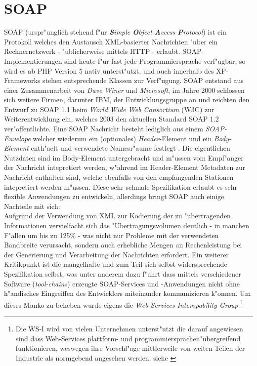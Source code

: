 \section{SOAP}
\label{sec:background:soap}
SOAP (urspr"unglich stehend f"ur \emph{\textbf{S}imple \textbf{O}bject \textbf{A}ccess \textbf{P}rotocol})
ist ein Protokoll welches den Austausch XML-basierter Nachrichten "uber ein Rechnernetzwerk - "ublicherweise
mittels HTTP - erlaubt. SOAP-Implementierungen sind heute f"ur fast jede Programmiersprache verf"ugbar, so wird es
ab PHP Version 5 nativ unterst"utzt, und auch innerhalb des XP-Frameworks stehen entsprechende Klassen zur Verf"ugung.
SOAP entstand aus einer Zusammenarbeit von \emph{Dave Winer} und \emph{Microsoft}, im Jahre 2000 schlossen sich 
weitere Firmen, darunter IBM, der Entwicklungsgruppe an und reichten den Entwurf zu SOAP 1.1 beim 
\emph{World Wide Web Consortium} (W3C) zur Weiterentwicklung ein, welches 2003 den aktuellen Standard SOAP 1.2
ver"offentlichte.
Eine SOAP Nachricht besteht lediglich aus einem \emph{SOAP-Envelope} welcher wiederum ein (optionales) \emph{Header}-Element
und ein \emph{Body-Element} enth"aelt und verwendete Namesr"aume festlegt \cite{SOAPSPEC}. Die eigentlichen Nutzdaten sind
im Body-Element untergebracht und m"ussen vom Empf"anger der Nachricht intepretiert werden, w"ahrend im Header-Element Metadaten
zur Nachricht enthalten sind, welche ebenfalls von den empfangenden Stationen intepretiert werden m"ussen. Diese sehr schmale
Spezifikation erlaubt es sehr flexible Anwendungen zu entwickeln, allerdings bringt SOAP auch einige Nachteile mit sich:\\
Aufgrund der Verwendung von XML zur Kodierung der zu "ubertragenden Informationen vervielfacht sich das "Ubertragungsvolumen
deutlich - in manchen F"allen um bis zu 125\% - was nicht nur Probleme mit der verwendeten Bandbreite verursacht, sondern auch
erhebliche Mengen an Rechenleistung bei der Generierung und Verarbeitung der Nachrichten erfordert. Ein weiterer Kritikpunkt ist
die mangelhafte und zum Teil sich selbst widersprechende Spezifikation selbst, was unter anderem dazu f"uhrt dass mittels verschiedener
Software (\emph{tool-chains}) erzeugte SOAP-Services und -Anwendungen nicht ohne h"andisches Eingreiffen des Entwicklers miteinander kommunizieren 
k"onnen. Um dieses Manko zu beheben wurde eigens die \emph{Web Services Interopability Group} \footnote{
Die WS-I wird von vielen Unternehmen unterst"utzt die darauf angewiesen sind dass Web-Services plattform- und programmiersprachen"ubergreifend
funktionieren, weswegen ihre Vorschl"age mittlerweile von weiten Teilen der Industrie als normgebend angesehen werden.
siehe \cite{WSIHP}
}
